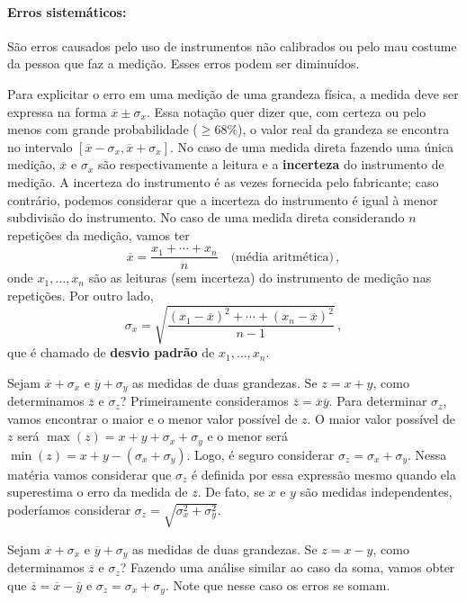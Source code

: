 \documentclass[12pt, a4paper]{article}
\begin{document}
\paragraph{Erros sistemáticos:} São erros causados pelo uso de instrumentos não calibrados ou pelo mau costume da pessoa que faz a medição. Esses erros podem ser diminuídos.

Para explicitar o erro em uma medição de uma grandeza física, a medida deve ser expressa na forma $\overline{x}\pm \sigma_x$. Essa notação quer dizer que, com certeza ou pelo menos com grande probabilidade ($\ge 68\%$), o valor real da grandeza se encontra no intervalo $[\overline{x}-\sigma_x, \overline{x}+\sigma_x]$. No caso de uma medida direta fazendo uma única medição, $\overline{x}$ e $\sigma_x$ são respectivamente a leitura e a \textbf{incerteza} do instrumento de medição. A incerteza do instrumento é as vezes fornecida pelo fabricante; caso contrário, podemos considerar que a incerteza do instrumento é igual à menor subdivisão do instrumento. No caso de uma medida direta considerando $n$ repetições da medição, vamos ter 
$$\overline{x}=\frac{x_1+\cdots+x_n}{n}\quad\text{(média aritmética)}\,,$$
onde $x_1,\ldots,x_n$ são as leituras (sem incerteza) do instrumento de medição nas repetições. Por outro lado,
$$\sigma_x=\sqrt{\frac{(x_1-\overline{x})^2+\cdots+(x_n-\overline{x})^2}{n-1}}\,,$$
que é chamado de \textbf{desvio padrão} de $x_1,\ldots,x_n$.

Sejam $\overline{x}+\sigma_x$ e $\overline{y}+\sigma_y$ as medidas de duas grandezas. Se $z=x+y$, como determinamos $\overline{z}$ e $\sigma_z$? Primeiramente consideramos $\overline{z}=\overline{x}\overline{y}$. Para determinar $\sigma_z$, vamos encontrar o maior e o menor valor possível de $z$. O maior valor possível de $z$ será $\max(z)=x+y+\sigma_x+\sigma_y$ e o menor será $\min(z)=x+y-(\sigma_x+\sigma_y)$. Logo, é seguro considerar $\sigma_z=\sigma_x+\sigma_y$. Nessa matéria vamos considerar que $\sigma_z$ é definida por essa expressão mesmo quando ela superestima o erro da medida de $z$. De fato, se $x$ e $y$ são medidas independentes, poderíamos considerar $\sigma_z=\sqrt{\sigma_x^2+\sigma_y^2}$.

Sejam $\overline{x}+\sigma_x$ e $\overline{y}+\sigma_y$ as medidas de duas grandezas. Se $z=x-y$, como determinamos $\overline{z}$ e $\sigma_z$? Fazendo uma análise similar ao caso da soma, vamos obter que $\overline{z}=\overline{x}-\overline{y}$ e $\sigma_z=\sigma_x+\sigma_y$. Note que nesse caso os erros se somam.
\end{document}
